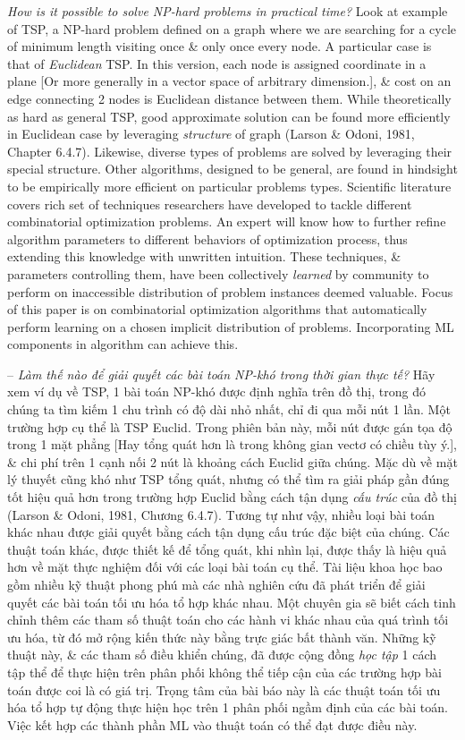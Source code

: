 \documentclass{article}
\begin{document}
\begin{itemize}
    {\it How is it possible to solve NP-hard problems in practical time?} Look at example of TSP, a NP-hard problem defined on a graph where we are searching for a cycle of minimum length visiting once \& only once every node. A particular case is that of {\it Euclidean} TSP. In this version, each node is assigned coordinate in a plane [Or more generally in a vector space of arbitrary dimension.], \& cost on an edge connecting 2 nodes is Euclidean distance between them. While theoretically as hard as general TSP, good approximate solution can be found more efficiently in Euclidean case by leveraging {\it structure} of graph (Larson \& Odoni, 1981, Chapter 6.4.7). Likewise, diverse types of problems are solved by leveraging their special structure. Other algorithms, designed to be general, are found in hindsight to be empirically more efficient on particular problems types. Scientific literature covers rich set of techniques researchers have developed to tackle different combinatorial optimization problems. An expert will know how to further refine algorithm parameters to different behaviors of optimization process, thus extending this knowledge with unwritten intuition. These techniques, \& parameters controlling them, have been collectively {\it learned} by community to perform on inaccessible distribution of problem instances deemed valuable. Focus of this paper is on combinatorial optimization algorithms that automatically perform learning on a chosen implicit distribution of problems. Incorporating ML components in algorithm can achieve this.

    -- {\it Làm thế nào để giải quyết các bài toán NP-khó trong thời gian thực tế?} Hãy xem ví dụ về TSP, 1 bài toán NP-khó được định nghĩa trên đồ thị, trong đó chúng ta tìm kiếm 1 chu trình có độ dài nhỏ nhất, chỉ đi qua mỗi nút 1 lần. Một trường hợp cụ thể là TSP Euclid. Trong phiên bản này, mỗi nút được gán tọa độ trong 1 mặt phẳng [Hay tổng quát hơn là trong không gian vectơ có chiều tùy ý.], \& chi phí trên 1 cạnh nối 2 nút là khoảng cách Euclid giữa chúng. Mặc dù về mặt lý thuyết cũng khó như TSP tổng quát, nhưng có thể tìm ra giải pháp gần đúng tốt hiệu quả hơn trong trường hợp Euclid bằng cách tận dụng {\it cấu trúc} của đồ thị (Larson \& Odoni, 1981, Chương 6.4.7). Tương tự như vậy, nhiều loại bài toán khác nhau được giải quyết bằng cách tận dụng cấu trúc đặc biệt của chúng. Các thuật toán khác, được thiết kế để tổng quát, khi nhìn lại, được thấy là hiệu quả hơn về mặt thực nghiệm đối với các loại bài toán cụ thể. Tài liệu khoa học bao gồm nhiều kỹ thuật phong phú mà các nhà nghiên cứu đã phát triển để giải quyết các bài toán tối ưu hóa tổ hợp khác nhau. Một chuyên gia sẽ biết cách tinh chỉnh thêm các tham số thuật toán cho các hành vi khác nhau của quá trình tối ưu hóa, từ đó mở rộng kiến thức này bằng trực giác bất thành văn. Những kỹ thuật này, \& các tham số điều khiển chúng, đã được cộng đồng {\it học tập} 1 cách tập thể để thực hiện trên phân phối không thể tiếp cận của các trường hợp bài toán được coi là có giá trị. Trọng tâm của bài báo này là các thuật toán tối ưu hóa tổ hợp tự động thực hiện học trên 1 phân phối ngầm định của các bài toán. Việc kết hợp các thành phần ML vào thuật toán có thể đạt được điều này.


\end{itemize}
\end{document}
